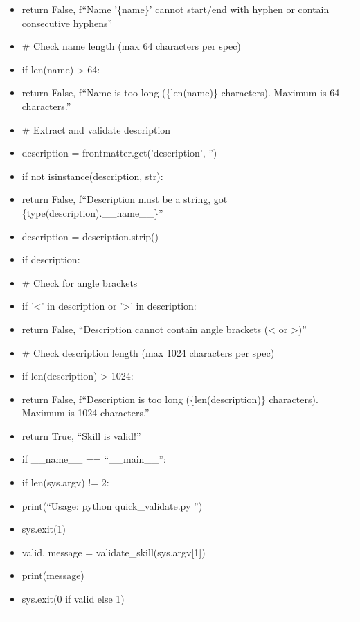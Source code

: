 \documentclass[11pt]{article}
\begin{document}
\begin{itemize}[leftmargin=*,itemsep=2pt,topsep=2pt]
\item {} return False, f``Name '\{name\}' cannot start/end with hyphen or contain consecutive hyphens''
\item {} \# Check name length (max 64 characters per spec)
\item {} if len(name) > 64:
\item {} return False, f``Name is too long (\{len(name)\} characters). Maximum is 64 characters.''
\item {} \# Extract and validate description
\item {} description = frontmatter.get('description', '')
\item {} if not isinstance(description, str):
\item {} return False, f``Description must be a string, got \{type(description).\_\allowbreak{}\_\allowbreak{}name\_\allowbreak{}\_\allowbreak{}\}''
\item {} description = description.strip()
\item {} if description:
\item {} \# Check for angle brackets
\item {} if '<' in description or '>' in description:
\item {} return False, ``Description cannot contain angle brackets (< or >)''
\item {} \# Check description length (max 1024 characters per spec)
\item {} if len(description) > 1024:
\item {} return False, f``Description is too long (\{len(description)\} characters). Maximum is 1024 characters.''
\item {} return True, ``Skill is valid!''
\item {} if \_\allowbreak{}\_\allowbreak{}name\_\allowbreak{}\_\allowbreak{} == ``\_\allowbreak{}\_\allowbreak{}main\_\allowbreak{}\_\allowbreak{}'':
\item {} if len(sys.argv) != 2:
\item {} print(``Usage: python quick\_\allowbreak{}validate.py '')
\item {} sys.exit(1)
\item {} valid, message = validate\_\allowbreak{}skill(sys.argv[1])
\item {} print(message)
\item {} sys.exit(0 if valid else 1)
\end{itemize}

\vspace{0.8em}\hrule\vspace{0.8em}
\end{document}
